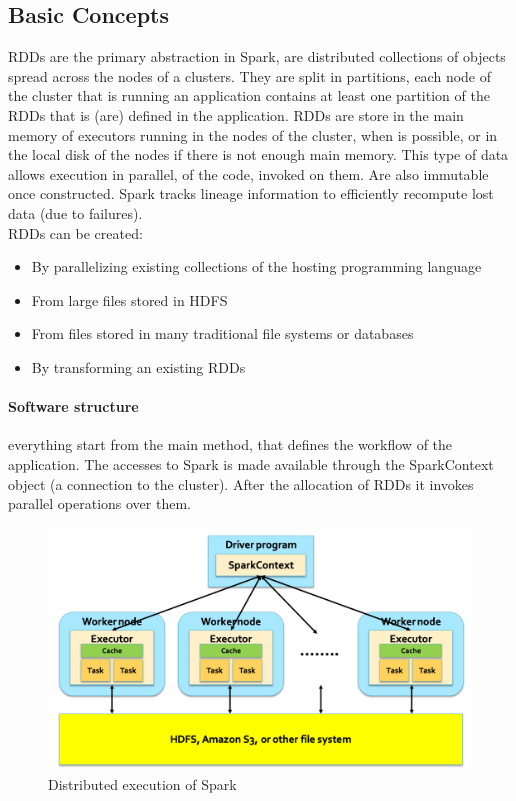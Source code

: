 \documentclass[12pt]{article}
\begin{document}
\subsection{Basic Concepts}
RDDs are the primary abstraction in Spark, are distributed collections of objects spread across the nodes of a clusters. They are split in partitions, each node of the cluster that is running an application contains at least one partition of the RDDs that is (are) defined in the application. RDDs are store in the main memory of executors running in the nodes of the cluster, when is possible, or in the local disk of the nodes if there is not enough main memory. This type of data allows execution in parallel, of the code, invoked on them. Are also immutable once constructed. Spark tracks lineage information to efficiently recompute lost data (due to failures).\\
RDDs can be created:
\begin{itemize}
  \item By parallelizing existing collections of the hosting programming language
  \item From large files stored in HDFS
  \item From files stored in many traditional file systems or databases
  \item By transforming an existing RDDs
\end{itemize}

\paragraph{Software structure} everything start from the main method, that defines the workflow of the application. The accesses to Spark is made available through the SparkContext object (a connection to the cluster). After the allocation of RDDs it invokes parallel operations over them.
\begin{figure}[H]
  \includegraphics[width=\linewidth]{images/execution.png}
  \caption{Distributed execution of Spark}
  \label{fig:execution}
\end{figure}
\end{document}

